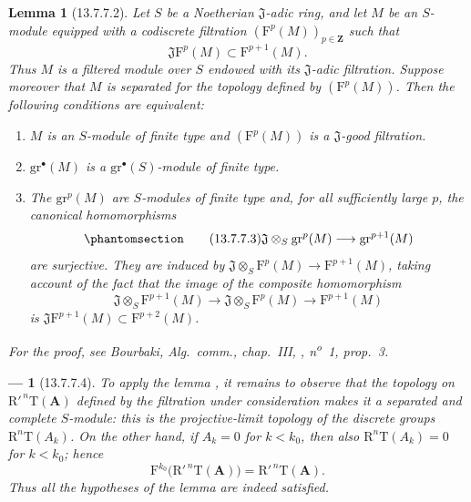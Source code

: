 \documentclass[oneside]{amsart}
\theoremstyle{ega-env-style}
\newtheorem*{env}{---}
\theoremstyle{ega-thm-env-style}
\newtheorem*{lemma}{Lemma}
\theoremstyle{ega-defn-env-style}
\def\bb{\mathbf}                    %
\def\RR{\mathrm{R}}                 %
\newcommand{\oldpage}[2][]{{\marginnote{\normalfont{\textbf{#1}~|~#2}}}\ignorespaces}
\let\EGAOriginalLabel\label
\renewcommand{\label}[1]{\phantomsection\EGAOriginalLabel{#1}}
\begin{document}
\begin{lemma}[13.7.7.2]
\label{0.13.7.7.2}
Let $S$ be a Noetherian $\mathfrak{J}$-adic ring, and let $M$
be an $S$-module equipped with a codiscrete filtration
$(\mathrm{F}^p(M))_{p\in\bb{Z}}$ such that
\[
  \mathfrak{J}\mathrm{F}^p(M)
  \subset
  \mathrm{F}^{p+1}(M).
\]
Thus $M$ is a filtered module over $S$ endowed with its
$\mathfrak{J}$-adic filtration.
Suppose moreover that $M$ is separated for the topology defined by
$(\mathrm{F}^p(M))$.
Then the following conditions are equivalent:
\begin{enumerate}
  \item[{\rm a)}] $M$ is an $S$-module of finite type and
  $(\mathrm{F}^p(M))$ is a $\mathfrak{J}$-good filtration.
  \item[{\rm b)}] $\mathrm{gr}^\bullet(M)$ is a
  $\mathrm{gr}^\bullet(S)$-module of finite type.
  \item[{\rm c)}] The $\mathrm{gr}^p(M)$ are $S$-modules of
  finite type and, for all sufficiently large $p$, the canonical
  homomorphisms
  \begin{equation}
  \label{0.13.7.7.3}
  \tag{13.7.7.3}
    \mathfrak{J}\otimes_S\mathrm{gr}^p(M)
    \longrightarrow
    \mathrm{gr}^{p+1}(M)
  \end{equation}
  \oldpage[0\textsubscript{III}]{79}
  are surjective.
  They are induced by
  $\mathfrak{J}\otimes_S\mathrm{F}^p(M)
  \longrightarrow\mathrm{F}^{p+1}(M)$, taking account of the fact
  that the image of the composite homomorphism
  \[
    \mathfrak{J}\otimes_S\mathrm{F}^{p+1}(M)
    \longrightarrow
    \mathfrak{J}\otimes_S\mathrm{F}^p(M)
    \longrightarrow
    \mathrm{F}^{p+1}(M)
  \]
  is
  $\mathfrak{J}\mathrm{F}^{p+1}(M)
  \subset\mathrm{F}^{p+2}(M)$.
\end{enumerate}

For the proof, see Bourbaki, \emph{Alg.\ comm.}, chap.~III,
, n\textsuperscript{o}~1, prop.~3.
\end{lemma}

\begin{env}[13.7.7.4]
\label{0.13.7.7.4}
To apply the lemma , it remains to observe that the
topology on $\RR'^{\,n}\mathrm{T}(\bb{A})$ defined by the filtration
under consideration makes it a separated and complete $S$-module:
this is the projective-limit topology of the discrete groups
$\RR^n\mathrm{T}(A_k)$.
On the other hand, if $A_k=0$ for $k<k_0$, then also
$\RR^n\mathrm{T}(A_k)=0$ for $k<k_0$; hence
\[
  \mathrm{F}^{k_0}\bigl(\RR'^{\,n}\mathrm{T}(\bb{A})\bigr)
  =
  \RR'^{\,n}\mathrm{T}(\bb{A}).
\]
Thus all the hypotheses of the lemma are indeed satisfied.
\end{env}
\end{document}
